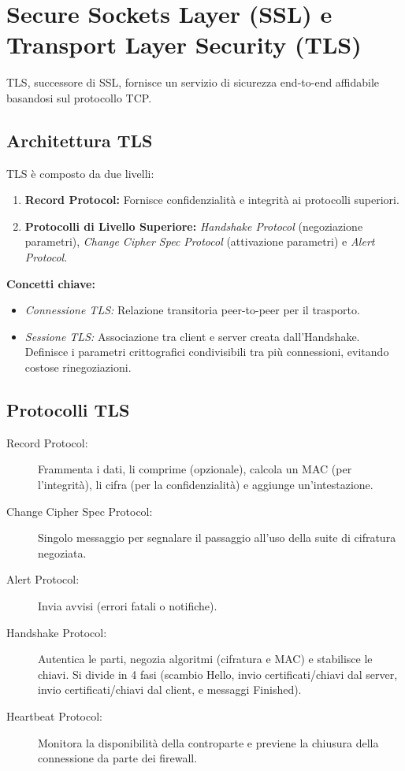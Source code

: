 \section{Secure Sockets Layer (SSL) e Transport Layer Security (TLS)}

TLS, successore di SSL, fornisce un servizio di sicurezza end-to-end affidabile basandosi sul protocollo TCP.

\subsection{Architettura TLS}
TLS è composto da due livelli:
\begin{enumerate}
    \item \textbf{Record Protocol:} Fornisce confidenzialità e integrità ai protocolli superiori.
    \item \textbf{Protocolli di Livello Superiore:} \textit{Handshake Protocol} (negoziazione parametri), \textit{Change Cipher Spec Protocol} (attivazione parametri) e \textit{Alert Protocol}.
\end{enumerate}

\textbf{Concetti chiave:}
\begin{itemize}
    \item \textit{Connessione TLS:} Relazione transitoria peer-to-peer per il trasporto.
    \item \textit{Sessione TLS:} Associazione tra client e server creata dall'Handshake. Definisce i parametri crittografici condivisibili tra più connessioni, evitando costose rinegoziazioni.
\end{itemize}



\subsection{Protocolli TLS}
\begin{description}
    \item[Record Protocol:] Frammenta i dati, li comprime (opzionale), calcola un MAC (per l'integrità), li cifra (per la confidenzialità) e aggiunge un'intestazione.
    \item[Change Cipher Spec Protocol:] Singolo messaggio per segnalare il passaggio all'uso della suite di cifratura negoziata.
    \item[Alert Protocol:] Invia avvisi (errori fatali o notifiche).
    \item[Handshake Protocol:] Autentica le parti, negozia algoritmi (cifratura e MAC) e stabilisce le chiavi. Si divide in 4 fasi (scambio Hello, invio certificati/chiavi dal server, invio certificati/chiavi dal client, e messaggi Finished).
    \item[Heartbeat Protocol:] Monitora la disponibilità della controparte e previene la chiusura della connessione da parte dei firewall.
\end{description}

